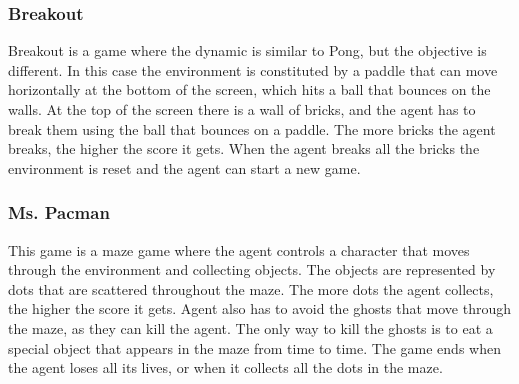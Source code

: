 \subsubsection{Breakout}
Breakout is a game where the dynamic is similar to Pong, but the objective is different.
In this case the environment is constituted by a paddle that can move horizontally at the bottom of the screen, which hits a ball that bounces on the walls.
At the top of the screen there is a wall of bricks, and the agent has to break them using the ball that bounces on a paddle.
The more bricks the agent breaks, the higher the score it gets.
When the agent breaks all the bricks the environment is reset and the agent can start a new game.


\subsubsection{Ms. Pacman}
This game is a maze game where the agent controls a character that moves through the environment and collecting objects.
The objects are represented by dots that are scattered throughout the maze.
The more dots the agent collects, the higher the score it gets.
Agent also has to avoid the ghosts that move through the maze, as they can kill the agent.
The only way to kill the ghosts is to eat a special object that appears in the maze from time to time.
The game ends when the agent loses all its lives, or when it collects all the dots in the maze. \\



